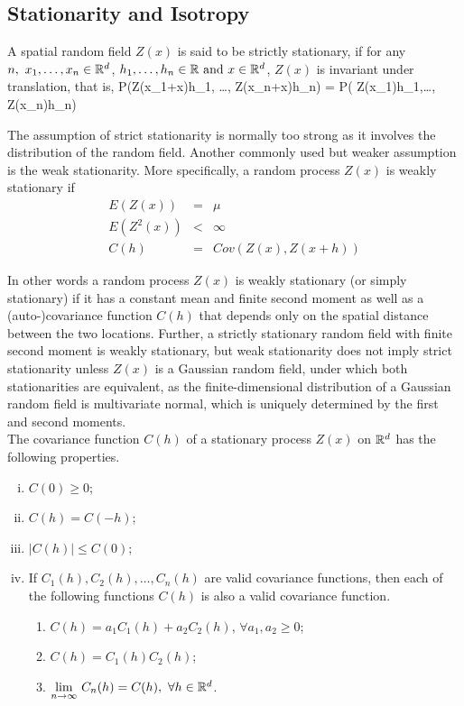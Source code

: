 \subsection{Stationarity and Isotropy}

A spatial random field $Z(x)$ is said to be strictly stationary, if for any $n,\ x_1,\ldots, x_n \in \mathbb{R}^d$, $h_1, \ldots, h_n\in\mathbb{R} \mbox{ and } x\in \mathbb{R}^d$, $Z(x)$ is invariant under translation, that is,
\beq
P(Z(x_1+x)\le h_1, \ldots, Z(x_n+x)\le h_n) = P( Z(x_1)\le h_1,\ldots, Z(x_n)\le h_n)
\eeq

The assumption of strict stationarity is normally too strong as it involves the distribution of the random field. Another commonly used but weaker assumption is the weak stationarity. More specifically, a random process $Z(x)$ is weakly stationary if
\begin{eqnarray}
	E(Z(x))   & = & \mu \nonumber \\
	E(Z^2(x)) & < & \infty \nonumber \\
	C(h)      & = & Cov(Z(x),Z(x+h))
\end{eqnarray}

In other words a random process $Z(x)$ is weakly stationary (or simply stationary) if it has a constant mean and finite second moment as well as a (auto-)covariance function $C(h)$ that depends only on the spatial distance between the two locations. Further, a strictly stationary random field with finite second moment is weakly stationary, but weak stationarity does not imply strict stationarity unless $Z(x)$ is a Gaussian random field, under which both stationarities are equivalent, as the finite-dimensional distribution of a Gaussian random field is multivariate normal, which is uniquely determined by the first and second moments. \\

The covariance function $C(h)$ of a stationary process $Z(x)$ on $\mathbb{R}^d$ has the following properties.

\begin{enumerate}[(i)]
	\item $C(0) \ge 0$;
	\item $C(h) = C(-h)$;
	\item $|C(h)| \le  C(0)$;
	\item If $C_1(h), C_2(h), \ldots, C_n(h)$ are valid covariance functions, then each of the following functions $C(h)$ is also a valid covariance function.
	
	      \begin{enumerate}
	      	\item $C(h) = a_1C_1(h)+a_2C_2(h)$, $\forall a_1,a_2\ge 0$;
	      	\item $C(h) = C_1(h)C_2(h)$;
	      	\item $\underset{n\to\infty} {\lim}\ C_n(h)=C(h),\ \forall h\in \R^d$.
	      \end{enumerate}
	
\end{enumerate}


